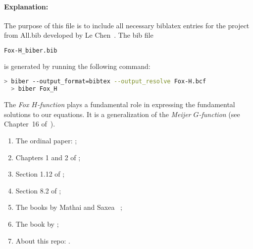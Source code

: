 \documentclass{article}
\begin{document}
\paragraph{Explanation:}


The purpose of this file is to include all necessary biblatex entries  for the
project  from All.bib developed by Le Chen~\cite{chen:23:spdes-bib}. The bib
file

\begin{lstlisting}[language=bash]
   Fox-H_biber.bib
\end{lstlisting}

is generated by running the following command:

\begin{lstlisting}[language=bash]
  > biber --output_format=bibtex --output_resolve Fox-H.bcf
  > biber Fox_H
\end{lstlisting}

The \textit{Fox $H$-function} plays a fundamental role in expressing the
fundamental solutions to our equations. It is a generalization of the
\textit{Meijer $G$-function} (see Chapter~16 of~\cite{olver.lozier.ea:10:nist}). 

\begin{enumerate}
  \item The ordinal paper: \cite{fox:61:g};
  \item Chapters 1 and 2 of \cite{kilbas.saigo:04:h-transforms};
  \item Section 1.12 of \cite{kilbas.srivastava.ea:06:theory};
  \item Section 8.2 of \cite{prudnikov.brychkov.ea:90:integrals};
  \item The books by Mathai and Saxea ~\cite{mathai.saxena.ea:10:h-function,
    mathai.saxena:78:h-function};
  \item The book by \cite{eidelman.ivasyshen.ea:04:analytic};
  \item About this repo: \cite{chen.hu:23:some}.
\end{enumerate}



\printbibliography[title={References}]
\end{document}
